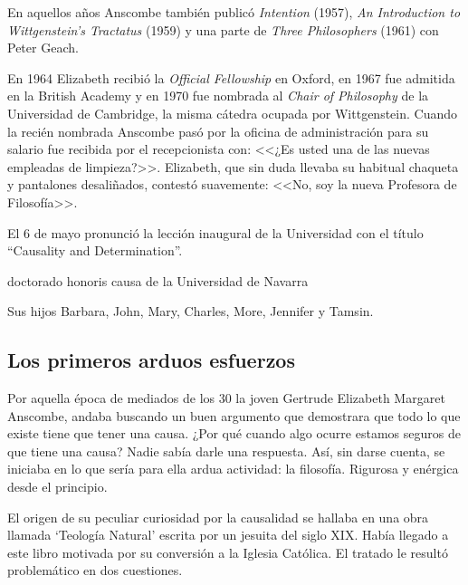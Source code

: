 En aquellos años Anscombe también publicó \emph{Intention} (1957), \emph{An Introduction to Wittgenstein's Tractatus} (1959) y una parte de \emph{Three Philosophers} (1961) con Peter Geach.\autocite[Cf.~][39]{teichman2002fellows}

En 1964 Elizabeth recibió la \emph{Official Fellowship} en Oxford, en 1967 fue admitida en la British Academy y en 1970 fue nombrada al \emph{Chair of Philosophy} de la Universidad de Cambridge, la misma cátedra ocupada por Wittgenstein. Cuando la recién nombrada Anscombe pasó por la oficina de administración para su salario fue recibida por el recepcionista con: <<¿Es usted una de las nuevas empleadas de limpieza?>>. Elizabeth, que sin duda llevaba su habitual chaqueta y pantalones desaliñados, contestó suavemente: <<No, soy la nueva Profesora de Filosofía>>.\autocite[cfr.~][p.~37]{teichman2002fellows}

El 6 de mayo pronunció la lección inaugural de la Universidad con el título ``Causality and Determination''.

doctorado honoris causa de la Universidad de Navarra

Sus hijos Barbara, John, Mary, Charles, More, Jennifer y Tamsin.

\subsection{Los primeros arduos esfuerzos}


Por aquella época de mediados de los 30 la joven Gertrude Elizabeth Margaret Anscombe, andaba buscando un buen argumento que demostrara que todo lo que existe tiene que tener una causa. ¿Por qué cuando algo ocurre estamos seguros de que tiene una causa? Nadie sabía darle una respuesta.\autocite[cf.~][p.~vii ]{anscombe1981metaphysicsintro} Así, sin darse cuenta, se iniciaba en lo que sería para ella ardua actividad: la filosofía. Rigurosa y enérgica desde el principio.

El origen de su peculiar curiosidad por la causalidad se hallaba en una obra llamada `Teología Natural' escrita por un jesuita del siglo XIX. Había llegado a este libro motivada por su conversión a la Iglesia Católica.\autocite[cf.~][p.~vii]{anscombe1981metaphysicsintro} El tratado le resultó problemático en dos cuestiones.

